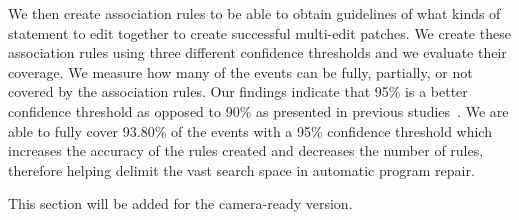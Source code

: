 \documentclass[sigconf]{acmart}
\begin{document}
We then create association rules to be able to obtain guidelines of what kinds of
statement to edit together to create successful multi-edit patches. 
We create these association rules using three different confidence thresholds and
we evaluate their coverage.
We measure how many of the events
can be fully, partially, or not covered by the association rules.
Our findings indicate that 95\% is a better confidence threshold as 
opposed to 90\% as presented in previous studies~\cite{Soto18}. 
We are able to fully cover 93.80\% of the events with a 95\% confidence threshold
which increases the accuracy of the rules created and decreases the 
number of rules, therefore helping delimit the vast search space 
in automatic program repair.




\begin{acks}
 This section will be added for the camera-ready version.

\end{acks}




\end{document}
